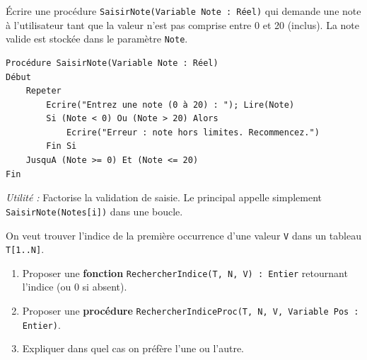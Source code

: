 \documentclass[11pt]{article}
\begin{document}
\begin{exercice}
Écrire une procédure \texttt{SaisirNote(Variable Note : Réel)} qui demande une note à l'utilisateur tant que la valeur n'est pas comprise entre 0 et 20 (inclus). La note valide est stockée dans le paramètre \texttt{Note}.
\end{exercice}

\begin{corrige}[Exercice 2]
\begin{lstlisting}
Procédure SaisirNote(Variable Note : Réel)
Début
    Repeter
        Ecrire("Entrez une note (0 à 20) : "); Lire(Note)
        Si (Note < 0) Ou (Note > 20) Alors
            Ecrire("Erreur : note hors limites. Recommencez.")
        Fin Si
    JusquA (Note >= 0) Et (Note <= 20)
Fin
\end{lstlisting}
\emph{Utilité :} Factorise la validation de saisie. Le principal appelle simplement \texttt{SaisirNote(Notes[i])} dans une boucle.
\end{corrige}

\begin{exercice}
On veut trouver l'indice de la première occurrence d'une valeur \texttt{V} dans un tableau \texttt{T[1..N]}.
\begin{enumerate}
    \item Proposer une \textbf{fonction} \texttt{RechercherIndice(T, N, V) : Entier} retournant l'indice (ou 0 si absent).
    \item Proposer une \textbf{procédure} \texttt{RechercherIndiceProc(T, N, V, Variable Pos : Entier)}.
    \item Expliquer dans quel cas on préfère l'une ou l'autre.
\end{enumerate}
\end{exercice}
\end{document}
